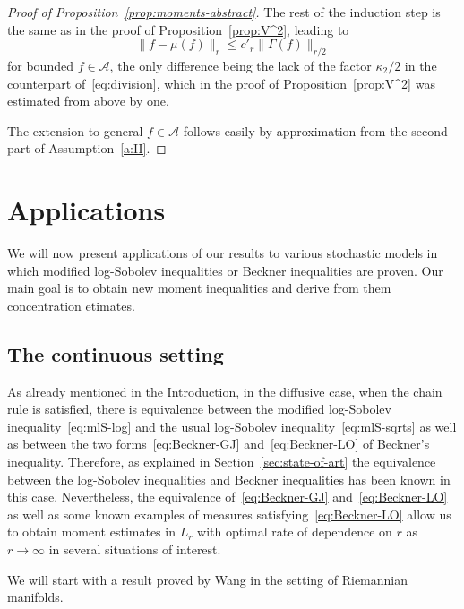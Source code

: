 \documentclass[a4paper]{amsart}
\theoremstyle{definition}
\theoremstyle{remark}
\numberwithin{equation}{section}
\newcommand*{\calA}{\mathcal{A}}
\begin{document}
\begin{proof}[Proof of Proposition~\ref{prop:moments-abstract}]
The rest of the induction step is the same as in the proof of Proposition~\ref{prop:V^2}, leading to
\begin{displaymath}
  \|f - \mu(f)\|_r \le c'_r\|\Gamma(f)\|_{r/2}
\end{displaymath}
for bounded $f \in \mathcal{A}$, the only difference being the lack of the factor $\kappa_2/2$ in the counterpart of~\eqref{eq:division}, which in the proof of Proposition~\ref{prop:V^2} was estimated from above by one.

The extension to general $f \in \calA$ follows easily by approximation from the second part of Assumption~\ref{a:II}.
\end{proof}


\section{Applications}\label{sec:applications}

We will now present applications of our results to various stochastic models in which modified log-Sobolev inequalities or Beckner inequalities are proven. Our main goal is to obtain new moment inequalities and derive from them concentration etimates.

\subsection{The continuous setting}\label{sec:continuous}

As already mentioned in the Introduction, in the diffusive case, when the chain rule is satisfied, there is equivalence between the modified log-Sobolev inequality~\eqref{eq:mlS-log} and the usual log-Sobolev inequality~\eqref{eq:mlS-sqrts} as well as between the two forms~\eqref{eq:Beckner-GJ} and~\eqref{eq:Beckner-LO} of Beckner's inequality. 
Therefore, as explained in Section~\ref{sec:state-of-art} the equivalence between the log-Sobolev inequalities and Beckner inequalities has been known in this case. 
Nevertheless, the equivalence of~\eqref{eq:Beckner-GJ} and~\eqref{eq:Beckner-LO} as well as some known examples of measures satisfying~\eqref{eq:Beckner-LO} allow us to obtain moment estimates in $L_r$ with optimal rate of dependence on $r$ as $r\to \infty$ in several situations of interest.

We will start with a result proved by Wang \cite[Corollary 1.3]{MR2127729} in the setting of Riemannian manifolds.
\end{document}
